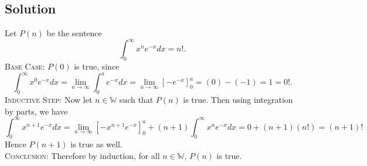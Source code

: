 \documentclass{article}
\begin{document}
\subsection*{Solution}
    Let $P(n)$ be the sentence $$\int_0^\infty x^ne^{-x}dx = n!.$$
    \textsc{Base Case}: $P(0)$ is true, since $$\int_0^\infty x^0e^{-x}dx = \lim_{a \to \infty} \int_0^a e^{-x}dx = \lim_{a \to \infty}\left[ -e^{-x} \right]_0^a = (0) - (-1) = 1 = 0!.$$
    \textsc{Inductive Step}: Now let $n \in \mathbb{W}$ such that $P(n)$ is true. Then using integration by parts, we have $$\int_0^\infty x^{n + 1}e^{-x}dx = \lim_{a \to \infty} \left[ -x^{n + 1}e^{-x}\right]_0^a + (n + 1)\int_0^\infty x^ne^{-x}dx = 0 + (n + 1)(n!) = (n + 1)!$$ Hence $P(n + 1)$ is true as well. \\
    \textsc{Conclusion}: Therefore by induction, for all $n \in \mathbb{W}$, $P(n)$ is true.
\end{document}
